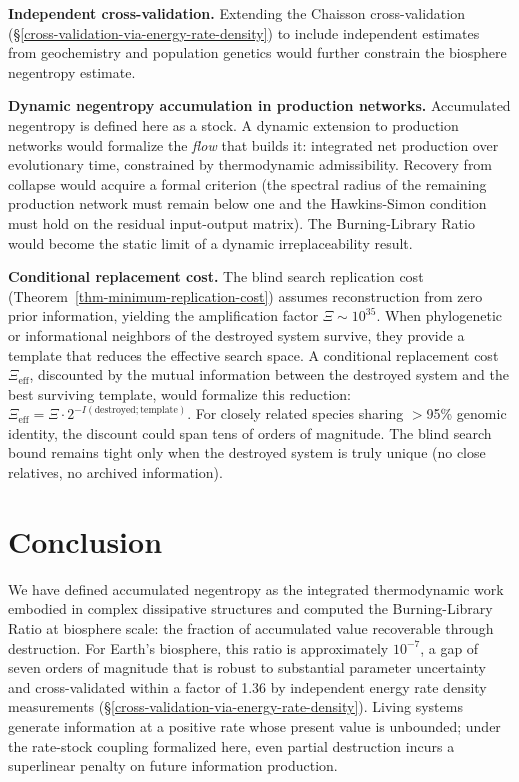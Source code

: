 \documentclass[11pt]{article}
\theoremstyle{plain}
\theoremstyle{definition}
\theoremstyle{remark}
\let\origsection\section
\renewcommand{\section}{\needspace{12\baselineskip}\origsection}
\begin{document}
\textbf{Independent cross-validation.} Extending the Chaisson
cross-validation (§\ref{cross-validation-via-energy-rate-density}) to
include independent estimates from geochemistry and population genetics
would further constrain the biosphere negentropy estimate.

\textbf{Dynamic negentropy accumulation in production networks.}
Accumulated negentropy is defined here as a stock. A dynamic extension
to production networks would formalize the \emph{flow} that builds it:
integrated net production over evolutionary time, constrained by
thermodynamic admissibility. Recovery from collapse would acquire a
formal criterion (the spectral radius of the remaining production
network must remain below one and the Hawkins-Simon condition must hold
on the residual input-output matrix). The Burning-Library Ratio would
become the static limit of a dynamic irreplaceability result.

\textbf{Conditional replacement cost.} The blind search replication cost
(Theorem~\ref{thm-minimum-replication-cost}) assumes reconstruction from
zero prior information, yielding the amplification factor
\(\Xi \sim 10^{35}\). When phylogenetic or informational neighbors of
the destroyed system survive, they provide a template that reduces the
effective search space. A conditional replacement cost
\(\Xi_{\text{eff}}\), discounted by the mutual information between the
destroyed system and the best surviving template, would formalize this
reduction:
\(\Xi_{\text{eff}} = \Xi \cdot 2^{-I(\text{destroyed};\text{template})}\).
For closely related species sharing $>$95\% genomic identity, the
discount could span tens of orders of magnitude. The blind search bound
remains tight only when the destroyed system is truly unique (no close
relatives, no archived information).

\section{Conclusion}\label{conclusion}

We have defined accumulated negentropy as the integrated thermodynamic
work embodied in complex dissipative structures and computed the
Burning-Library Ratio at biosphere scale: the fraction of accumulated
value recoverable through destruction. For Earth's biosphere, this ratio
is approximately \(10^{-7}\), a gap of seven orders of magnitude that is
robust to substantial parameter uncertainty and cross-validated within a
factor of 1.36 by independent energy rate density measurements
(§\ref{cross-validation-via-energy-rate-density}). Living systems
generate information at a positive rate whose present value is
unbounded; under the rate-stock coupling formalized here, even partial
destruction incurs a superlinear penalty on future information
production.
\end{document}
